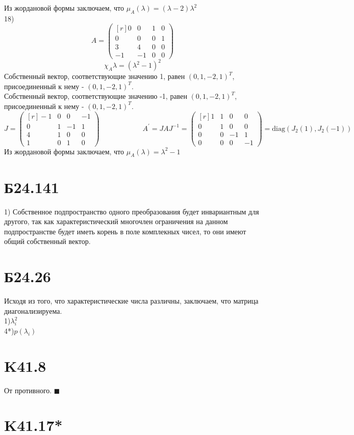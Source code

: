 \documentclass[a4paper,12pt]{article} %
\begin{document}
Из жордановой формы заключаем, что $\mu_A(\lambda)=(\lambda-2)\lambda^2$\\
18)$$A=\begin{pmatrix*}[r]
    0&0&1&0\\
    0&0&0&1\\
    3&4&0&0\\
    -1&-1&0&0
\end{pmatrix*}$$
$$\chi_A{\lambda}=(\lambda^2-1)^2$$
Собственный вектор, соответствующие значению 1, равен $(0,1,-2,1)^{T}$, присоединенный к нему - $(0,1,-2,1)^{T}$.\\
Собственный вектор, соответствующие значению -1, равен $(0,1,-2,1)^{T}$, присоединенный к нему - $(0,1,-2,1)^{T}$.
$$J=\begin{pmatrix*}[r]
    -1&0&0&-1\\
    0&1&-1&1\\
    4&1&0&0\\
    1&0&1&0
\end{pmatrix*}\qquad\qquad\qquad A^{\prime}=JAJ^{-1}=\begin{pmatrix*}[r]
    1&1&0&0\\
    0&1&0&0\\
    0&0&-1&1\\
    0&0&0&-1
\end{pmatrix*}=\mathrm{diag}(J_2(1),J_2(-1))$$
Из жордановой формы заключаем, что $\mu_A(\lambda)=\lambda^2-1$\\
\section*{Б24.141}1) Собственное подпространство одного преобразования будет инвариантным для другого, так как характеристический многочлен ограничения на данном подпространстве будет иметь корень в поле комплекных чисел, то они имеют общий собственный вектор.
\section*{Б24.26}
Исходя из того, что характеристические числа различны, заключаем, что матрица диагонализируема.\\
1)$\lambda_i^2$\\
4*)$p(\lambda_i)$
\section*{K41.8} От противного. $\blacksquare$
\section*{K41.17*}
\end{document}
